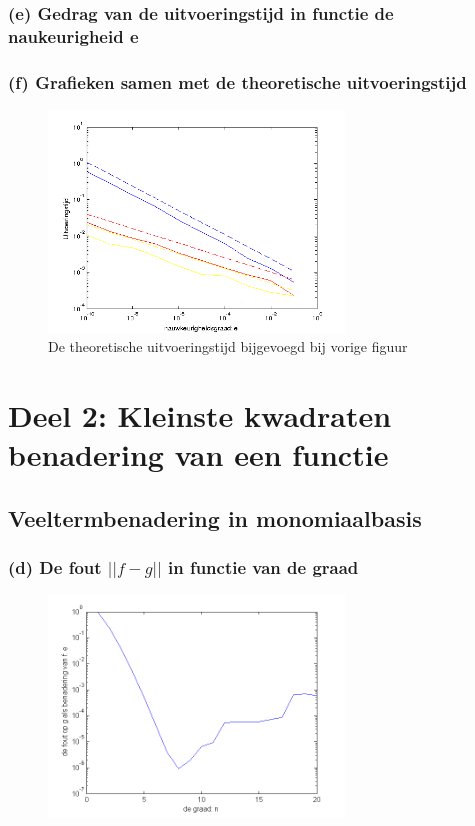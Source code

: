 \documentclass[11pt,a4paper]{article}
\begin{document}
\subsubsection*{(e) Gedrag van de uitvoeringstijd in functie de naukeurigheid e}

\subsubsection*{(f) Grafieken samen met de theoretische uitvoeringstijd}
\begin{figure}[H]
	\centering
	\includegraphics[width=0.7\textwidth]{12f.png}
	\caption*{De theoretische uitvoeringstijd bijgevoegd bij vorige figuur}
	\end{figure}
\section{Deel 2: Kleinste kwadraten benadering van een functie}
\subsection{Veeltermbenadering in monomiaalbasis}
\subsubsection*{(d) De fout $||f-g||$ in functie van de graad}

\begin{figure}[H]
	\centering
	\includegraphics[width=0.7\textwidth]{22d1.png}
	\caption*{}
	\end{figure}
	
\end{document}
